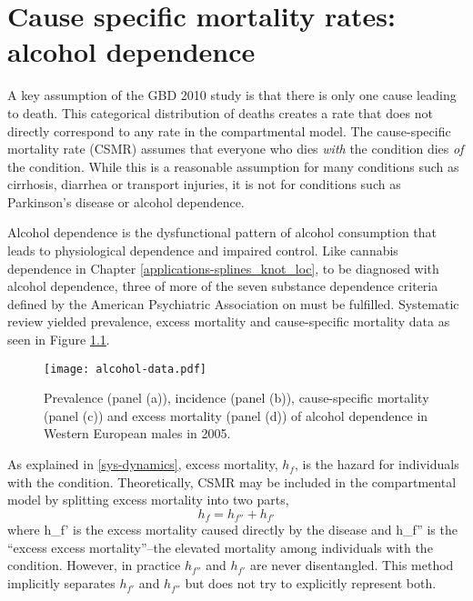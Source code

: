 \chapter{Cause specific mortality rates: alcohol dependence}
\label{applications-csmr}

A key assumption of the GBD 2010 study is that there is only one cause leading to death.  This categorical distribution of deaths creates a rate that does not directly correspond to any rate in the compartmental model.  The cause-specific mortality rate (CSMR) assumes that everyone who dies \emph{with} the condition dies \emph{of} the condition.  While this is a reasonable assumption for many conditions such as cirrhosis, diarrhea or transport injuries, it is not for conditions such as Parkinson's disease or alcohol dependence.

Alcohol dependence is the dysfunctional pattern of alcohol consumption that leads to physiological dependence and impaired control.  Like cannabis dependence in Chapter \ref{applications-splines_knot_loc}, to be diagnosed with alcohol dependence, three of more of the seven substance dependence criteria defined by the American Psychiatric Association on \pageref{tab:app-substance_dependence} must be fulfilled. \cite{american_diagnostic_2000, hasin_prevalence_2007}  Systematic review yielded prevalence, excess mortality and cause-specific mortality data as seen in Figure \ref{fig:app-alcohol data}.

    \begin{figure}[h]
        \begin{center}
            \texttt{[image: alcohol-data.pdf]}
            \caption{Prevalence (panel (a)), incidence (panel (b)), cause-specific mortality (panel (c)) and excess mortality (panel (d)) of alcohol dependence in Western European males in 2005.}
            \label{fig:app-alcohol data}
        \end{center}
    \end{figure} 

As explained in \ref{sys-dynamics}, excess mortality, $h_{f}$, is the hazard for individuals with the condition.  Theoretically, CSMR may be included in the compartmental model by splitting excess mortality into two parts,
    \begin{equation}
        h_{f} = h_{f''} + h_{f'}
    \end{equation}
where h_{f'} is the excess mortality caused directly by the disease and h_{f''} is the ``excess excess mortality''--the elevated mortality among individuals with the condition.  However, in practice $h_{f''}$ and $h_{f'}$ are never disentangled.  This method implicitly separates $h_{f'}$ and $h_{f''}$ but does not try to explicitly represent both.

